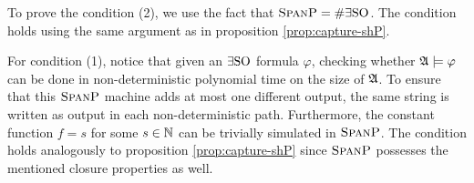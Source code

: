 To prove the condition (2), we use the fact that $\text{\sc SpanP} = \#\exists{\rm SO}$. The condition holds using the same argument as in proposition \ref{prop:capture-shP}.

For condition (1), notice that given an $\exists{\rm SO}$ formula $\varphi$, checking whether $\mathfrak{A}\models\varphi$ can be done in non-deterministic polynomial time on the size of $\mathfrak{A}$\cite{fagin1974generalized}. To ensure that this $\text{\sc SpanP}$ machine adds at most one different output, the same string is written as output in each non-deterministic path. Furthermore, the constant function $f = s$ for some $s\in\mathbb{N}$ can be trivially simulated in $\text{\sc SpanP}$. The condition holds analogously to proposition \ref{prop:capture-shP} since $\text{\sc SpanP}$ possesses the mentioned closure properties as well\cite{OH93}.

